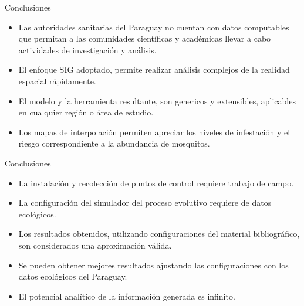 \begin{frame}[t]{Conclusiones}
    \begin{itemize}
        \item Las autoridades sanitarias del Paraguay no cuentan con datos computables que permitan a las comunidades científicas y académicas llevar a cabo actividades de investigación y análisis.

        \item El enfoque SIG adoptado, permite realizar análisis complejos de la realidad espacial rápidamente.


        \item El modelo y la herramienta resultante, son genericos y extensibles, aplicables en cualquier región o área de estudio.

        \item Los mapas de interpolación permiten apreciar los niveles de infestación y el riesgo correspondiente a la abundancia de mosquitos.

    \end{itemize}
\end{frame}

\begin{frame}[t]{Conclusiones}
    \begin{itemize}

        \item La instalación y recolección de puntos de control requiere trabajo de campo.

        \item La configuración del simulador del proceso evolutivo requiere de datos ecológicos.

        \item Los resultados obtenidos, utilizando configuraciones del material bibliográfico, son considerados una aproximación válida.

        \item Se pueden obtener mejores resultados ajustando las configuraciones con los datos ecológicos del Paraguay.

        \item El potencial analítico de la información generada es infinito.
    \end{itemize}
\end{frame}
